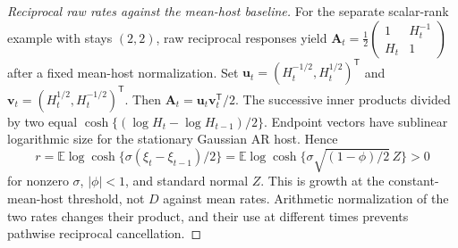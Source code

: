 \begin{proof}[Reciprocal raw rates against the mean-host baseline]
For the separate scalar-rank example with stays \((2,2)\), raw reciprocal responses yield
\(\mathbf A_t=\tfrac12\begin{pmatrix}1&H_t^{-1}\\H_t&1\end{pmatrix}\)
after a fixed mean-host normalization. Set
\(\mathbf u_t=(H_t^{-1/2},H_t^{1/2})^{\mathsf T}\) and
\(\mathbf v_t=(H_t^{1/2},H_t^{-1/2})^{\mathsf T}\).
Then \(\mathbf A_t=\mathbf u_t\mathbf v_t^{\mathsf T}/2\). The successive inner products divided by two equal
\(\cosh\{(\log H_t-\log H_{t-1})/2\}\).
Endpoint vectors have sublinear logarithmic size for the stationary Gaussian AR host. Hence
\begin{equation}\label{eq:mech-reciprocal}
 r=\mathbb E\log\cosh\{\sigma(\xi_t-\xi_{t-1})/2\}
 =\mathbb E\log\cosh\{\sigma\sqrt{(1-\phi)/2}\,Z\}>0
\end{equation}
for nonzero \(\sigma\), \(|\phi|<1\), and standard normal \(Z\). This is growth at the constant-mean-host threshold, not \(D\) against mean rates. Arithmetic normalization of the two rates changes their product, and their use at different times prevents pathwise reciprocal cancellation.
\end{proof}

